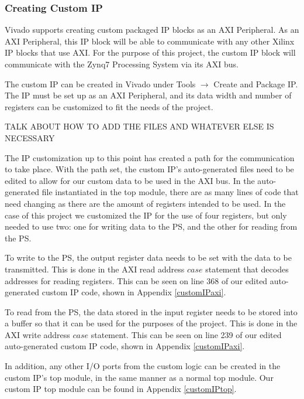 \subsubsection{Creating Custom IP}
Vivado supports creating custom packaged IP blocks as an AXI Peripheral. As an AXI Peripheral, this IP block will be able to communicate with any other Xilinx IP blocks that use AXI. For the purpose of this project, the custom IP block will communicate with the Zynq7 Processing System via its AXI bus.
\par
The custom IP can be created in Vivado under Tools $\rightarrow$ Create and Package IP. The IP must be set up as an AXI Peripheral, and its data width and number of registers can be customized to fit the needs of the project.
\par
TALK ABOUT HOW TO ADD THE FILES AND WHATEVER ELSE IS NECESSARY
\par
The IP customization up to this point has created a path for the communication to take place. With the path set, the custom IP's auto-generated files need to be edited to allow for our custom data to be used in the AXI bus. In the auto-generated file instantiated in the top module, there are as many lines of code that need changing as there are the amount of registers intended to be used. In the case of this project we customized the IP for the use of four registers, but only needed to use two: one for writing data to the PS, and the other for reading from the PS.
\par
To write to the PS, the output register data needs to be set with the data to be transmitted. This is done in the AXI read address $case$ statement that decodes addresses for reading registers. This can be seen on line 368 of our edited auto-generated custom IP code, shown in Appendix \ref{customIPaxi}.
\par
To read from the PS, the data stored in the input register needs to be stored into a buffer so that it can be used for the purposes of the project. This is done in the AXI write address $case$ statement. This can be seen on line 239 of our edited auto-generated custom IP code, shown in Appendix \ref{customIPaxi}.
\par
In addition, any other I/O ports from the custom logic can be created in the custom IP's top module, in the same manner as a normal top module. Our custom IP top module can be found in Appendix \ref{customIPtop}.

